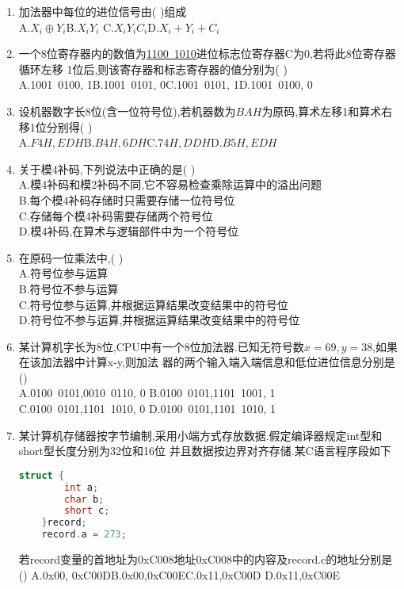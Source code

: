 \documentclass[12pt, a4paper, oneside, UTF8]{ctexbook}
\begin{document}
\begin{enumerate}
    \item \bl 加法器中每位的进位信号由(   )组成\\
    A.$X_i\oplus Y_i$\qquad B.$X_iY_i$ \qquad C.$X_iY_iC_i$\qquad D.$X_i+Y_i+C_i$ 

    \item 一个8位寄存器内的数值为\underline{1100\ 1010}进位标志位寄存器C为0,若将此8位寄存器循环左移
    1位后,则该寄存器和标志寄存器的值分别为(   ) \\
    A.1001\ 0100, 1\qquad B.1001\ 0101, 0\qquad C.1001\ 0101, 1\qquad D.1001\ 0100, 0

    \item 设机器数字长8位(含一位符号位),若机器数为$BAH$为原码,算术左移1和算术右移1位分别得(   ) \\
    A.$F4H,EDH$\qquad B.$B4H,6DH$\qquad C.$74H,DDH$\qquad D.$B5H,EDH$ 

    \item 关于模4补码,下列说法中正确的是(   ) \\
    A.模4补码和模2补码不同,它不容易检查乘除运算中的溢出问题 \\
    B.每个模4补码存储时只需要存储一位符号位 \\
    C.存储每个模4补码需要存储两个符号位\\ 
    D.模4补码,在算术与逻辑部件中为一个符号位 

    \item 在原码一位乘法中,(   ) \\
    A.符号位参与运算 \\
    B.符号位不参与运算 \\
    C.符号位参与运算,并根据运算结果改变结果中的符号位 \\
    D.符号位不参与运算,并根据运算结果改变结果中的符号位

    \item \bl 某计算机字长为8位,CPU中有一个8位加法器.已知无符号数$x=69,y=38$,如果在该加法器中计算x-y,则加法
    器的两个输入端入端信息和低位进位信息分别是() \\
    A.0100\ 0101,0010\ 0110, 0 \qquad B.0100\ 0101,1101\ 1001, 1 \\
    C.0100\ 0101,1101\ 1010, 0 \qquad D.0100\ 0101,1101\ 1010, 1

    \item \bt 某计算机存储器按字节编制,采用小端方式存放数据.假定编译器规定int型和short型长度分别为32位和16位
    并且数据按边界对齐存储.某C语言程序段如下
\begin{lstlisting}[language=C]
    struct {
        int a;
        char b;
        short c;
    }record;
    record.a = 273;
\end{lstlisting}
    若record变量的首地址为0xC008地址0xC008中的内容及record.c的地址分别是()
    A.0x00, 0xC00D\qquad B.0x00,0xC00E\qquad C.0x11,0xC00D \qquad D.0x11,0xC00E 


\end{enumerate}
\end{document}
